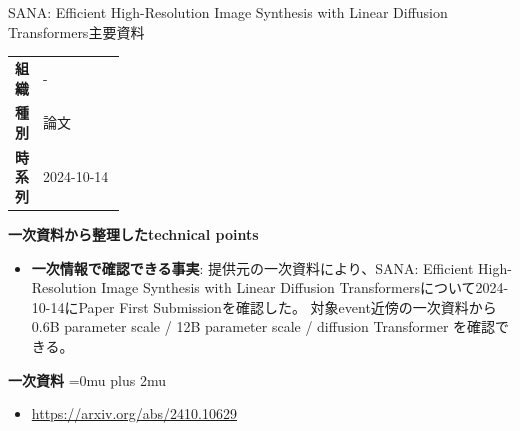 \begin{technicalnote}{SANA: Efficient High-Resolution Image Synthesis with Linear Diffusion Transformers}{主要資料}
\begingroup
\begin{tabularx}{\linewidth}{@{}>{\bfseries}p{0.22\linewidth}X@{}}
組織 & - \\
種別 & 論文 \\
時系列 & 2024-10-14 \\
\end{tabularx}
\smallskip
{\bfseries 一次資料から整理したtechnical points}
\begin{itemize}[leftmargin=1.5em,itemsep=0.35em]
\item \textbf{一次情報で確認できる事実}: 提供元の一次資料により、SANA: Efficient High-Resolution Image Synthesis with Linear Diffusion Transformersについて2024-10-14にPaper First Submissionを確認した。 対象event近傍の一次資料から 0.6B parameter scale / 12B parameter scale / diffusion Transformer を確認できる。
\end{itemize}
\begin{minipage}{\linewidth}
\begin{samepage}
{\bfseries 一次資料}
\begingroup\sloppy
\Urlmuskip=0mu plus 2mu\relax
\begin{itemize}[leftmargin=1.5em,itemsep=0.25em]
\item {\scriptsize\url{https://arxiv.org/abs/2410.10629}}
\end{itemize}
\endgroup
\end{samepage}
\end{minipage}
\endgroup
\end{technicalnote}
\medskip

